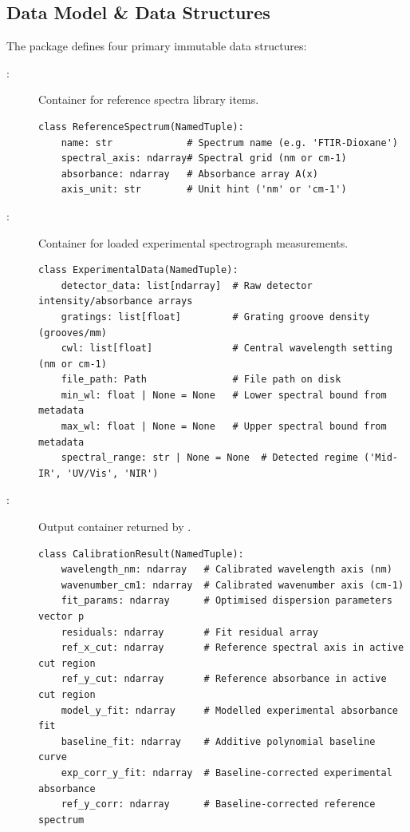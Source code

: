 \subsection{Data Model \& Data Structures}

The  package defines four primary immutable data structures:

\begin{description}
  \item[:] Container for reference spectra library items.
\begin{lstlisting}
class ReferenceSpectrum(NamedTuple):
    name: str             # Spectrum name (e.g. 'FTIR-Dioxane')
    spectral_axis: ndarray# Spectral grid (nm or cm-1)
    absorbance: ndarray   # Absorbance array A(x)
    axis_unit: str        # Unit hint ('nm' or 'cm-1')
\end{lstlisting}

  \item[:] Container for loaded experimental spectrograph measurements.
\begin{lstlisting}
class ExperimentalData(NamedTuple):
    detector_data: list[ndarray]  # Raw detector intensity/absorbance arrays
    gratings: list[float]         # Grating groove density (grooves/mm)
    cwl: list[float]              # Central wavelength setting (nm or cm-1)
    file_path: Path               # File path on disk
    min_wl: float | None = None   # Lower spectral bound from metadata
    max_wl: float | None = None   # Upper spectral bound from metadata
    spectral_range: str | None = None  # Detected regime ('Mid-IR', 'UV/Vis', 'NIR')
\end{lstlisting}

  \item[:] Output container returned by .
\begin{lstlisting}
class CalibrationResult(NamedTuple):
    wavelength_nm: ndarray   # Calibrated wavelength axis (nm)
    wavenumber_cm1: ndarray  # Calibrated wavenumber axis (cm-1)
    fit_params: ndarray      # Optimised dispersion parameters vector p
    residuals: ndarray       # Fit residual array
    ref_x_cut: ndarray       # Reference spectral axis in active cut region
    ref_y_cut: ndarray       # Reference absorbance in active cut region
    model_y_fit: ndarray     # Modelled experimental absorbance fit
    baseline_fit: ndarray    # Additive polynomial baseline curve
    exp_corr_y_fit: ndarray  # Baseline-corrected experimental absorbance
    ref_y_corr: ndarray      # Baseline-corrected reference spectrum
\end{lstlisting}


\end{description}
